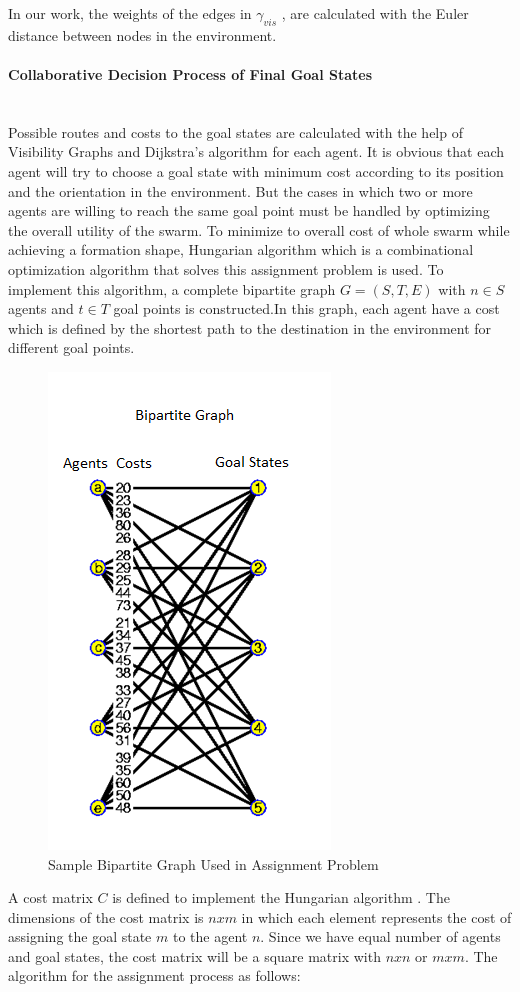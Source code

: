 In our work, the weights of the edges in $\gamma_{vis}$ , are calculated with the Euler distance between nodes in the environment.  

\paragraph{Collaborative Decision Process of Final Goal States}\hspace{0pt} \\
Possible routes and costs to the goal states are calculated with the help of Visibility Graphs and Dijkstra's algorithm  for each agent. It is obvious that each agent will try to choose a goal state with minimum cost according to its position and the orientation in the environment. But the cases in which two or more agents are willing to reach the same goal point must be handled by optimizing the overall utility of the swarm. To minimize to overall cost of whole swarm while achieving a formation shape, Hungarian algorithm which is a combinational optimization algorithm that solves this assignment problem is used. To implement this algorithm, a complete bipartite graph $G=(S,T,E)$ with $n \in S$ agents and $t \in T$ goal points is constructed.In this graph, each agent have a cost which is defined by the shortest path to the destination in the environment for different goal points. 

\begin{figure}[H]
\centering
\includegraphics[width=.4\textwidth]{bipartite}
\caption{Sample Bipartite Graph Used in Assignment Problem}
\end{figure}

A cost matrix  $C$ is defined to implement the Hungarian algorithm .  The dimensions of the cost matrix is $nxm$ in which each element represents the cost of assigning the goal state $m$ to the agent $n$.  Since we have equal number of agents and goal states, the cost matrix will be a square matrix with $nxn$ or $mxm$.  The algorithm for the assignment process as follows:
	
